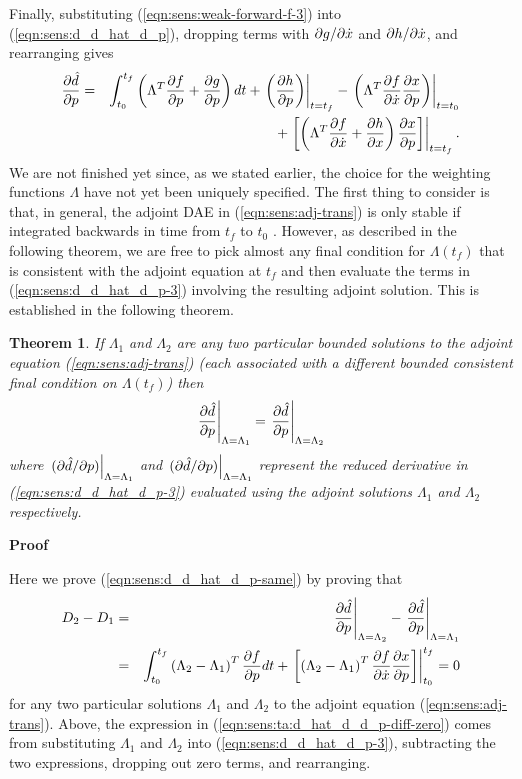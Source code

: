 \documentclass[pdf,ps2pdf,11pt]{SANDreport}
\newtheorem{theorem}{Theorem}
\begin{document}
Finally, substituting (\ref{eqn:sens:weak-forward-f-3}) into
(\ref{eqn:sens:d_d_hat_d_p}), dropping terms with $\partial g / \partial \dot{x}$ and
$\partial h / \partial \dot{x}$, and rearranging gives
%
\begin{eqnarray}
\displaystyle{\frac{\partial \hat{d}}{\partial p}} 
& = & \int_{t_0}^{t_f} \left( \Lambda^T \displaystyle{\frac{\partial f}{\partial p}} + \displaystyle{\frac{\partial g}{\partial p}} \right) dt
  + \left. \left( \displaystyle{\frac{\partial h}{\partial p}} \right) \right|_{t=t_f}
  - \left. \left( \Lambda^T \displaystyle{\frac{\partial f}{\partial \dot{x}}} \displaystyle{\frac{\partial x}{\partial p}} \right) \right|_{t=t_0}
\nonumber \\
& & + \left. \left[ \left(
    \Lambda^T \displaystyle{\frac{\partial f}{\partial \dot{x}}}
    +  \displaystyle{\frac{\partial h}{\partial x}}
  \right)  \displaystyle{\frac{\partial x}{\partial p}} \right] \right|_{t=t_f}.
\label{eqn:sens:d_d_hat_d_p-3}
\end{eqnarray}
%
We are not finished yet since, as we stated earlier, the choice for the
weighting functions $\Lambda$ have not yet been uniquely specified.  The first
thing to consider is that, in general, the adjoint DAE in
(\ref{eqn:sens:adj-trans}) is only stable if integrated backwards
in time from $t_f$ to $t_0$ {}\cite{adjoint-sens-2003}.  However, as described
in the following theorem, we are free to pick almost any final condition for
$\Lambda(t_f)$ that is consistent with the adjoint equation at $t_f$ and then
evaluate the terms in (\ref{eqn:sens:d_d_hat_d_p-3}) involving
the resulting adjoint solution.  This is established in the following theorem.

\begin{theorem}
If $\Lambda_1$ and $\Lambda_2$ are any two particular bounded solutions to the
adjoint equation (\ref{eqn:sens:adj-trans}) (each associated with
a different bounded consistent final condition on $\Lambda(t_f)$) then
%
\begin{equation}
\left.\displaystyle{\frac{\partial \hat{d}}{\partial p}}\right|_{\Lambda=\Lambda_1} = \left.\displaystyle{\frac{\partial \hat{d}}{\partial p}}\right|_{\Lambda=\Lambda_2}
\label{eqn:sens:d_d_hat_d_p-same}
\end{equation}
%
where $\left.(\partial \hat{d} / \partial p)\right|_{\Lambda=\Lambda_1}$ and
$\left.(\partial \hat{d} / \partial p)\right|_{\Lambda=\Lambda_1}$ represent the reduced
derivative in (\ref{eqn:sens:d_d_hat_d_p-3}) evaluated using the
adjoint solutions $\Lambda_1$ and $\Lambda_2$ respectively.
\end{theorem}

\textbf{Proof}

Here we prove (\ref{eqn:sens:d_d_hat_d_p-same}) by proving that
%
\begin{eqnarray}
D_2 - D_1
& = &
\left.\displaystyle{\frac{\partial \hat{d}}{\partial p}}\right|_{\Lambda=\Lambda_2} - \left.\displaystyle{\frac{\partial \hat{d}}{\partial p}}\right|_{\Lambda=\Lambda_1}
\nonumber \\
& = &
\int_{t_0}^{t_f} \left( \Lambda_2 - \Lambda_1 \right)^T \displaystyle{\frac{\partial f}{\partial p}} dt
+ \left.\left[ \left( \Lambda_2 - \Lambda_1 \right)^T \displaystyle{\frac{\partial f}{\partial \dot{x}}} \displaystyle{\frac{\partial x}{\partial p}} \right]\right|_{t_0}^{t_f}
= 0
\label{eqn:sens:ta:d_hat_d_d_p-diff-zero}
\end{eqnarray}
%
for any two particular solutions $\Lambda_1$ and $\Lambda_2$ to the adjoint
equation (\ref{eqn:sens:adj-trans}).  Above, the expression in
(\ref{eqn:sens:ta:d_hat_d_d_p-diff-zero}) comes from substituting $\Lambda_1$
and $\Lambda_2$ into (\ref{eqn:sens:d_d_hat_d_p-3}), subtracting the two
expressions, dropping out zero terms, and rearranging.
\end{document}
